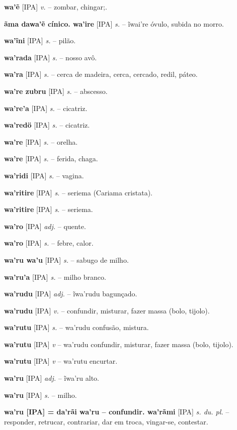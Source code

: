 \textbf{wa'ẽ} [IPA] \textit{v.} -- zombar, chingar;.

\textbf{ãma dawa'ẽ cínico. wa'ire} [IPA] \textit{s.} -- ĩwai're óvulo, subida no morro.

\textbf{wa'ĩni} [IPA] \textit{s.} -- pilão.

\textbf{wa'rada} [IPA] \textit{s.} -- nosso avô.

\textbf{wa'ra} [IPA] \textit{s.} -- cerca de madeira, cerca, cercado, redil, páteo.

\textbf{wa're zubru} [IPA] \textit{s.} -- abscesso.

\textbf{wa're'a} [IPA] \textit{s.} -- cicatriz.

\textbf{wa'redö} [IPA] \textit{s.} -- cicatriz.

\textbf{wa're} [IPA] \textit{s.} -- orelha.

\textbf{wa're} [IPA] \textit{s.} -- ferida, chaga.

\textbf{wa'ridi} [IPA] \textit{s.} -- vagina.

\textbf{wa'ritire} [IPA] \textit{s.} -- seriema (Cariama cristata).

\textbf{wa'ritire} [IPA] \textit{s.} -- seriema.

\textbf{wa'ro} [IPA] \textit{adj.} -- quente. \href{https://xavante.pythonanywhere.com/static/dicionario/play.html?file=hot.wav}{\faHeadphones}

\textbf{wa'ro} [IPA] \textit{s.} -- febre, calor.

\textbf{wa'ru wa'u} [IPA] \textit{s.} -- sabugo de milho.

\textbf{wa'ru'a} [IPA] \textit{s.} -- milho branco.

\textbf{wa'rudu} [IPA] \textit{adj.} -- ĩwa'rudu bagunçado.

\textbf{wa'rudu} [IPA] \textit{v.} -- confundir, misturar, fazer massa (bolo, tijolo).

\textbf{wa'rutu} [IPA] \textit{s.} -- wa'rudu confusão, mistura.

\textbf{wa'rutu} [IPA] \textit{v} -- wa'rudu confundir, misturar, fazer massa (bolo, tijolo).

\textbf{wa'rutu} [IPA] \textit{v} -- wa'rutu encurtar.

\textbf{wa'ru} [IPA] \textit{adj.} -- ĩwa'ru alto.

\textbf{wa'ru} [IPA] \textit{s.} -- milho.

\textbf{wa'ru [IPA]  = da'rãi wa'ru -- confundir. wa'rãmi} [IPA] \textit{s. du. pl.} -- responder, retrucar, contrariar, dar em troca, vingar-se, contestar.

